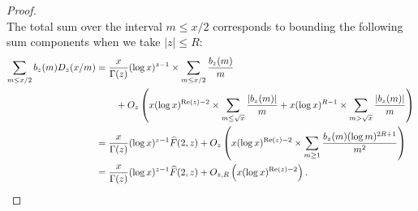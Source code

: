 \documentclass[11pt,reqno,a4letter]{article}
\numberwithin{figure}{section}
\numberwithin{table}{section}
\theoremstyle{plain}
\numberwithin{theorem}{section}
\theoremstyle{definition}
\renewcommand{\Re}{\operatorname{Re}}
\begin{document}
\begin{proof}
\[\]
The total sum over the interval $m \leq x/2$ corresponds to bounding the following 
sum components when we take $|z| \leq R$: 
\begin{align*} 
\sum_{m \leq x/2} b_z(m) D_z(x/m) & = \frac{x}{\Gamma(z)} (\log x)^{z-1} \times 
     \sum_{m \leq x/2} \frac{b_z(m)}{m} \\ 
     & \phantom{=\quad\ } + 
     O_z\left(x (\log x)^{\Re(z)-2} \times \sum_{m \leq \sqrt{x}} \frac{|b_z(m)|}{m} + 
     x (\log x)^{R-1} \times \sum_{m > \sqrt{x}} \frac{|b_z(m)|}{m}\right) \\ 
     & = \frac{x}{\Gamma(z)} (\log x)^{z-1} \widehat{F}(2, z) + O_z\left( 
     x (\log x)^{\Re(z)-2} \times \sum_{m \geq 1} \frac{b_z(m) (\log m)^{2R+1}}{m^2} 
     \right) \\ 
     & = \frac{x}{\Gamma(z)} (\log x)^{z-1} \widehat{F}(2, z) + O_{z,R}\left( 
     x (\log x)^{\Re(z)-2}\right). 
     \qedhere  
\end{align*} 
\end{proof} 
\end{document}
